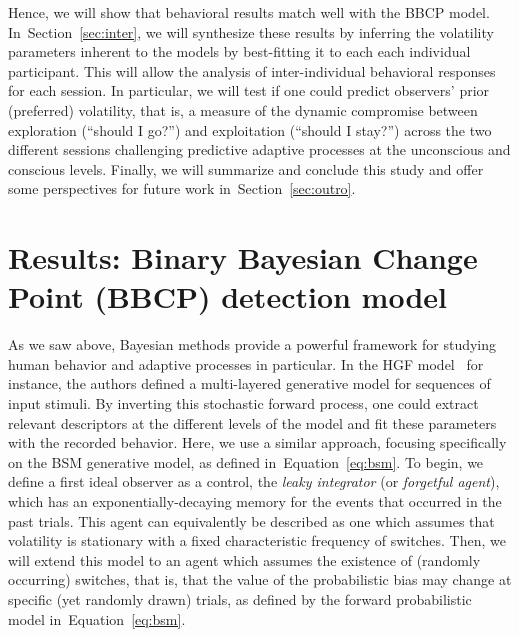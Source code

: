 \documentclass[12pt,english]{article}%
\newcommand{\citep}[1]{\parencite{#1}}
\newcommand{\seeEq}[1]{Equation~\ref{eq:#1}}
\newcommand{\seeSec}[1]{Section~\ref{sec:#1}}
\begin{document}
Hence, we will show that behavioral results match well
with the BBCP model.
In~\seeSec{inter}, we will synthesize these results
by inferring the volatility parameters inherent to the models
by best-fitting it to each each individual participant.
This will allow the analysis of inter-individual behavioral responses for each session.
In particular, we will test if one could predict observers' prior (preferred) volatility,
that is, a measure of the dynamic compromise between exploration (``should I go?'')
and exploitation (``should I stay?'')
across the two different sessions challenging predictive adaptive processes
at the unconscious and conscious levels.
Finally, we will summarize and conclude this study and
offer some perspectives for future work in~\seeSec{outro}.
%
\section{Results: Binary Bayesian Change Point (BBCP) detection model}
\label{sec:Bayesian_change_point}
%
%
As we saw above, Bayesian methods provide a powerful framework for studying human behavior and adaptive  processes in particular.
In the HGF model~\citep{Mathys11} for instance, the
authors defined a multi-layered generative model for
sequences of input stimuli.
By inverting this stochastic forward process,
one could extract relevant descriptors at the different levels of the model
and fit these parameters with the recorded behavior.
Here, we use a similar approach, focusing specifically on the BSM generative model,
as defined in~\seeEq{bsm}.
To begin, we define a first ideal observer as a control, the \textit{leaky integrator} (or \textit{forgetful agent}),
which has an exponentially-decaying memory for the events that occurred in the past trials.
This agent can equivalently be described as one
which assumes that volatility is stationary with a fixed characteristic frequency of switches.
Then, we will extend this model to an agent
which assumes the existence of (randomly occurring) switches, that is,
that the value of the probabilistic bias may change
at specific (yet randomly drawn) trials,
as defined by the forward probabilistic model in~\seeEq{bsm}.
%
\end{document}
